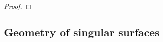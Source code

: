 \documentclass[12pt]{amsart}
\theoremstyle{plain}
\theoremstyle{definition}
\begin{document}
\begin{proof}
\end{proof}

\subsection{Geometry of singular surfaces}
\end{document}

